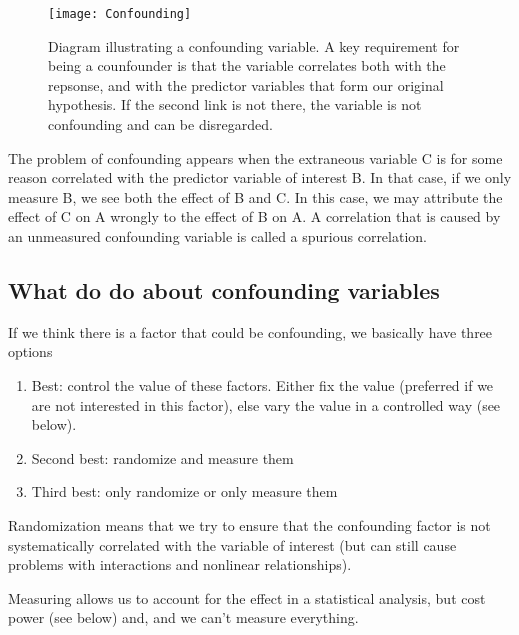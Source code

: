 \documentclass[a4paper,twoside]{tufte-book}\usepackage[]{graphicx}\usepackage[]{color}
\begin{document}
{\begin{figure}[]
\begin{center}
\texttt{[image: Confounding]}
\caption{Diagram illustrating a confounding variable. A key requirement for being a counfounder is that the variable correlates both with the repsonse, and with the predictor variables that form our original hypothesis. If the second link is not there, the variable is not confounding and can be disregarded.}
\label{fig: Confounding}
\end{center}
\end{figure}

The problem of confounding appears when the extraneous variable C is for some reason correlated with the predictor variable of interest B.  In that case, if we only measure B, we see both the effect of B and C. In this case, we may attribute the effect of C on A wrongly to the effect of B on A.  A correlation that is caused by an unmeasured confounding variable is called a spurious correlation.  

\subsection{What do do about confounding variables}

If we think there is a factor that could be confounding, we basically have three options

\begin{enumerate}
\item Best: control the value of these factors. Either fix the value (preferred if we are not interested in this factor), else vary the value in a controlled way (see below).
\item Second best: randomize and measure them
\item Third best: only randomize or only measure them
\end{enumerate}

Randomization means that we try to ensure that the confounding factor is not systematically correlated with the variable of interest (but can still cause problems with interactions and nonlinear relationships).


Measuring allows us to account for the effect in a statistical analysis, but cost power (see below) and, and we can't measure everything.

}
\end{document}

